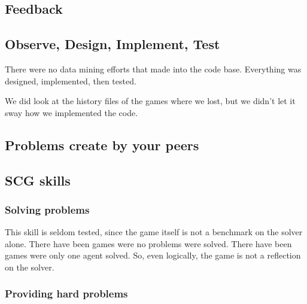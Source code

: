 \documentclass[letterpaper,12pt,oneside]{article}
\begin{document}
\subsection{Feedback}

\subsection{Observe, Design, Implement, Test}
There were no data mining efforts that made into the code base. Everything
was designed, implemented, then tested.

We did look at the history files of the games where we lost, but we didn't
let it sway how we implemented the code.

\subsection{Problems create by your peers}

\subsection{SCG skills}

\subsubsection{Solving problems}

This skill is seldom tested, since the game itself is not a benchmark on
the solver alone. There have been games were no problems were solved. There
have been games were only one agent solved. So, even logically, the game is
not a reflection on the solver.

\subsubsection{Providing hard problems}
\end{document}
